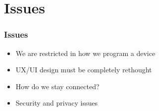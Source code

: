 \documentclass{beamer}
\begin{document}
     \section{Issues}
     \begin{frame}
     	\frametitle{Issues}
     \begin{itemize}
     	\item We are restricted in how we program a device
     	\item UX/UI design must be completely rethought
     	\item How do we stay connected?
     	\item Security and privacy issues
     \end{itemize}	
     \end{frame}   

    

        
\end{document}

